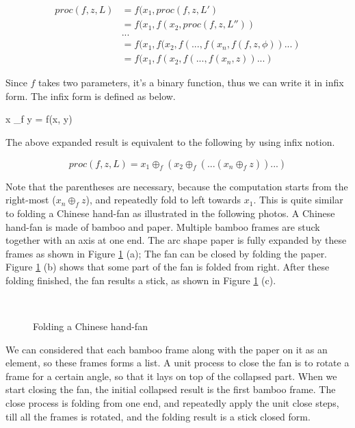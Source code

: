 \documentclass[b5paper]{article}
\begin{document}
\[
\begin{array}{rl}
proc(f, z, L) & = f(x_1, proc(f, z, L') \\
        & = f(x_1, f(x_2, proc(f, z, L'')) \\
        & ... \\
        & = f(x_1, f(x_2, f(..., f(x_n, f(f, z, \phi))...) \\
        & = f(x_1, f(x_2, f(..., f(x_n, z))...)
\end{array}
\]

Since $f$ takes two parameters, it's a binary function, thus we can write it in infix form. The infix
form is defined as below.

\be
x \oplus_f y = f(x, y)
\ee

The above expanded result is equivalent to the following by using infix notion.

\[
proc(f, z, L) = x_1 \oplus_f (x_2 \oplus_f (... (x_n \oplus_f z))...)
\]

Note that the parentheses are necessary, because the computation starts from the right-most ($x_n \oplus_f z$),
and repeatedly fold to left towards $x_1$. This is quite similar to folding a Chinese hand-fan as illustrated
in the following photos. A Chinese hand-fan is made of bamboo and paper. Multiple bamboo frames are stuck
together with an axis at one end. The arc shape paper is fully expanded by these frames as shown in Figure
\ref{fig:fold-fan} (a);
The fan can be closed by folding the paper. Figure \ref{fig:fold-fan} (b) shows that some part of the fan
is folded from right. After these folding finished, the fan results a stick, as shown in Figure \ref{fig:fold-fan} (c).

\begin{figure}[htbp]
    \centering
     \\
    \caption{Folding a Chinese hand-fan} \label{fig:fold-fan}
\end{figure}

We can considered that each bamboo frame along with the paper on it as an element, so these frames forms a
list. A unit process to close the fan is to rotate a frame for a certain angle, so that it lays on top
of the collapsed part. When we start closing the fan, the initial collapsed result is the first bamboo frame.
The close process is folding from one end, and repeatedly apply the unit close steps, till all the frames
is rotated, and the folding result is a stick closed form.
\end{document}

